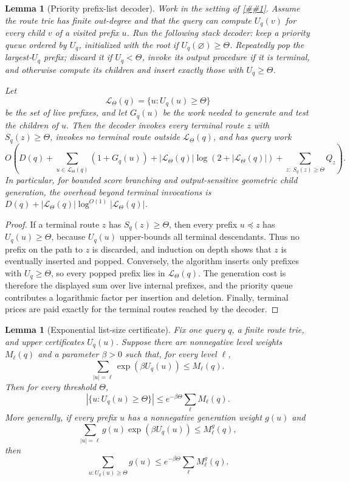 \documentclass[10pt]{article}
\newcommand{\cref}[1]{\ref{##1}}
\newtheorem{lemma}[theorem]{Lemma}
\theoremstyle{definition}
\begin{document}
\begin{lemma}[Priority prefix-list decoder]
   \label{lem:priority-prefix-list-decoder}
   Work in the setting of \cref{lem:prefix-list-decoder}.  Assume the route
   trie has finite out-degree and that the query can compute \(U_q(v)\) for
   every child \(v\) of a visited prefix \(u\).  Run the following stack
   decoder: keep a priority queue ordered by \(U_q\), initialized with the root
   if \(U_q(\varnothing)\ge\Theta\).  Repeatedly pop the largest-\(U_q\) prefix;
   discard it if \(U_q<\Theta\), invoke its output procedure if it is terminal,
   and otherwise compute its children and insert exactly those with
   \(U_q\ge\Theta\).

   Let
   \[
      \mathcal L_\Theta(q)=\{u:U_q(u)\ge\Theta\}
   \]
   be the set of live prefixes, and let \(G_q(u)\) be the work needed to
   generate and test the children of \(u\).  Then the decoder invokes every
   terminal route \(z\) with \(S_q(z)\ge\Theta\), invokes no terminal route
   outside \(\mathcal L_\Theta(q)\), and has query work
   \[
      O\!\left(
         D(q)
         +\sum_{u\in\mathcal L_\Theta(q)}(1+G_q(u))
         +|\mathcal L_\Theta(q)|\log(2+|\mathcal L_\Theta(q)|)
         +\sum_{z:\ S_q(z)\ge\Theta}Q_z
      \right).
   \]
   In particular, for bounded score branching and output-sensitive geometric
   child generation, the overhead beyond terminal invocations is
   \(D(q)+|\mathcal L_\Theta(q)|\log^{O(1)}|\mathcal L_\Theta(q)|\).
\end{lemma}

\begin{proof}
   If a terminal route \(z\) has \(S_q(z)\ge\Theta\), then every prefix
   \(u\preceq z\) has \(U_q(u)\ge\Theta\), because \(U_q(u)\) upper-bounds all
   terminal descendants.  Thus no prefix on the path to \(z\) is discarded, and
   induction on depth shows that \(z\) is eventually inserted and popped.
   Conversely, the algorithm inserts only prefixes with \(U_q\ge\Theta\), so
   every popped prefix lies in \(\mathcal L_\Theta(q)\).  The generation cost
   is therefore the displayed sum over live internal prefixes, and the priority
   queue contributes a logarithmic factor per insertion and deletion.  Finally,
   terminal prices are paid exactly for the terminal routes reached by the
   decoder.
\end{proof}

\begin{lemma}[Exponential list-size certificate]
   \label{lem:exponential-list-size}
   Fix one query \(q\), a finite route trie, and upper certificates \(U_q(u)\).
   Suppose there are nonnegative level weights \(M_\ell(q)\) and a parameter
   \(\beta>0\) such that, for every level \(\ell\),
   \[
      \sum_{|u|=\ell}\exp(\beta U_q(u))\le M_\ell(q).
   \]
   Then for every threshold \(\Theta\),
   \[
      |\{u:U_q(u)\ge\Theta\}|
      \le
      e^{-\beta\Theta}\sum_\ell M_\ell(q).
   \]
   More generally, if every prefix \(u\) has a nonnegative generation weight
   \(g(u)\) and
   \[
      \sum_{|u|=\ell}g(u)\exp(\beta U_q(u))\le M_\ell^g(q),
   \]
   then
   \[
      \sum_{u:U_q(u)\ge\Theta}g(u)
      \le
      e^{-\beta\Theta}\sum_\ell M_\ell^g(q).
   \]
\end{lemma}
\end{document}
